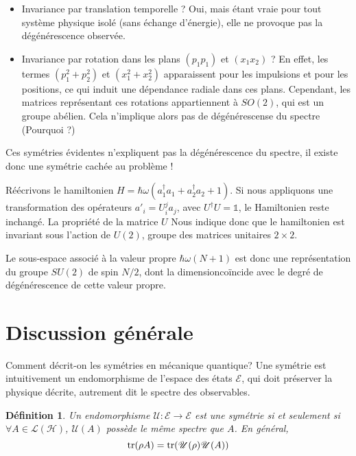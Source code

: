 \documentclass{report}
\numberwithin{equation}{part}
\newtheorem{definition}[theorem]{Définition}
\begin{document}
\begin{itemize}
    \item Invariance par translation temporelle ? Oui, mais étant vraie pour tout système physique isolé (sans échange d'énergie), elle ne provoque pas la dégénérescence observée.
    \item Invariance par rotation dans les plans $(p_1p_1)$ et $(x_1x_2)$ ? En effet, les termes $(p_1^2 + p_2^2)$ et $(x_1^2 + x_2^2)$ apparaissent pour les impulsions et pour les positions, ce qui induit une dépendance radiale dans ces plans. Cependant, les matrices représentant ces rotations appartiennent à $SO(2)$, qui est un groupe abélien. Cela n'implique alors pas de dégénérescense du spectre (Pourquoi ?)
\end{itemize}

Ces symétries évidentes n'expliquent pas la dégénérescence du spectre, il existe donc une symétrie cachée au problème !


Réécrivons le hamiltonien $H = \hbar\omega(a_1^\dagger a_1 + a_2^\dagger a_2 + 1)$. Si nous appliquons une transformation des opérateurs $a'_i = U_i^j a_j$, avec $U^\dagger U = \mathds{1}$, le Hamiltonien reste inchangé. La propriété de la matrice $U$ Nous indique donc que le hamiltonien est invariant sous l'action de $U(2)$, groupe des matrices unitaires $2\times 2$.

Le sous-espace associé à la valeur propre $\hbar\omega(N+1)$ est donc une représentation du groupe $SU(2)$ de spin $N/2$, dont la dimension\footnotemark coïncide avec le degré de dégénérescence de cette valeur propre.


\section{Discussion générale}

Comment décrit-on les symétries en mécanique quantique? Une symétrie est intuitivement un endomorphisme de l'espace des états $\mathcal{E}$, qui doit préserver la physique décrite, autrement dit le spectre des observables.

\begin{definition}
Un endomorphisme $\mathcal{U}:\mathcal{E} \to \mathcal{E}$ est une \emph{symétrie} si et seulement si $\forall A \in \mathcal{L}(\mathcal{H})$, $\mathcal{U}(A)$ possède le même spectre que $A$. En général,
$$ \tr(\rho A) = \tr(\mathcal{U}(\rho)\mathcal{U}(A)) $$
\end{definition}
\end{document}

